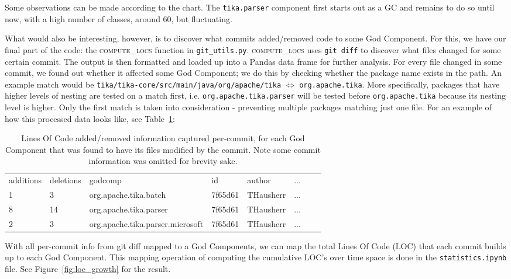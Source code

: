 \documentclass{article}
\begin{document}
Some observations can be made according to the chart. The \texttt{tika.parser} component first starts out as a GC and remains to do so until now, with a high number of classes, around 60, but fluctuating. 

What would also be interesting, however, is to discover what commits added/removed code to some God Component. For this, we have our final part of the code: the \textsc{compute\_locs} function in \texttt{git\_utils.py}. \textsc{compute\_locs} uses \texttt{git diff} to discover what files changed for some certain commit. The output is then formatted and loaded up into a Pandas data frame for further analysis. For every file changed in some commit, we found out whether it affected some God Component; we do this by checking whether the package name exists in the path. An example match would be \texttt{tika/tika-core/src/main/java/org/apache/tika} $\Leftrightarrow$ \texttt{org.apache.tika}. More specifically, packages that have higher levels of nesting are tested on a match first, i.e. \texttt{org.apache.tika.parser} will be tested before \texttt{org.apache.tika} because its nesting level is higher. Only the first match is taken into consideration - preventing multiple packages matching just one file. For an example of how this processed data looks like, see Table~\ref{tab:locs}:

\begin{table}[ht]
\begin{tabular}{llllllll}
additions & deletions & godcomp                          & id                                       & author    & ...\\
1         & 3         & org.apache.tika.batch            & 7f65d61 & THausherr & ... \\
8         & 14        & org.apache.tika.parser           & 7f65d61 & THausherr & ... \\
2         & 3         & org.apache.tika.parser.microsoft & 7f65d61 & THausherr & ... \\
\end{tabular}
\caption{Lines Of Code added/removed information captured per-commit, for each God Component that was found to have its files modified by the commit. Note some commit information was omitted for brevity sake.}
\label{tab:locs}
\end{table}

With all per-commit info from git diff mapped to a God Components, we can map the total Lines Of Code (LOC) that each commit builds up to each God Component. This mapping operation of computing the cumulative LOC's over time space is done in the \texttt{statistics.ipynb} file. See Figure~\ref{fig:loc_growth} for the result.
\end{document}
